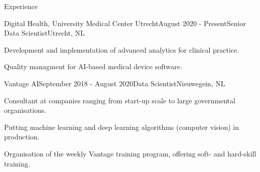 \documentclass{resume} %
\begin{document}

\begin{rSection}{Experience}

	\begin{rSubsection}{Digital Health, University Medical Center Utrecht}{August 2020 - Present}{Senior Data Scientist}{Utrecht, NL}
	\vspace{-1.5em}
	\item Development and implementation of advanced analytics for clinical practice.
	\item Quality managment for AI-based medical device software.
	\end{rSubsection}
	
	\begin{rSubsection}{Vantage AI}{September 2018 - August 2020}{Data Scientist}{Nieuwegein, NL}
	\vspace{-1.5em}
	\item Consultant at companies ranging from start-up scale to large governmental organisations.	
	\item Putting machine learning and deep learning algorithms (computer vision) in production.
	\item Organisation of the weekly Vantage training program, offering soft- and hard-skill training.
	\end{rSubsection}
	
	
	
	\end{rSection}

\end{document}
